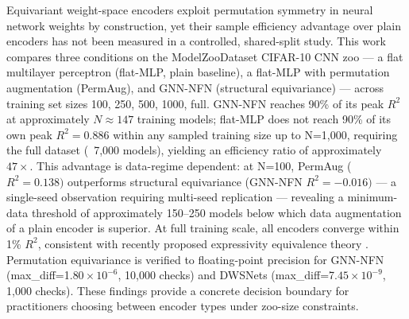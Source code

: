 
Equivariant weight-space encoders exploit permutation symmetry in neural network weights by construction, yet their sample efficiency advantage over plain encoders has not been measured in a controlled, shared-split study. This work compares three conditions on the ModelZooDataset CIFAR-10 CNN zoo --- a flat multilayer perceptron (flat-MLP, plain baseline), a flat-MLP with permutation augmentation (PermAug), and GNN-NFN (structural equivariance) --- across training set sizes {100, 250, 500, 1000, full}. GNN-NFN reaches 90\% of its peak $R^2$ at approximately $N\approx 147$ training models; flat-MLP does not reach 90\% of its own peak $R^{2}=0.886$ within any sampled training size up to N=1,000, requiring the full dataset (~7,000 models), yielding an efficiency ratio of approximately $47\times$. This advantage is data-regime dependent: at N=100, PermAug ($R^{2}=0.138)$ outperforms structural equivariance (GNN-NFN $R^{2}=-0.016)$ --- a single-seed observation requiring multi-seed replication --- revealing a minimum-data threshold of approximately 150--250 models below which data augmentation of a plain encoder is superior. At full training scale, all encoders converge within 1\% $R^2$, consistent with recently proposed expressivity equivalence theory \citep{Dayan2026Expressive}. Permutation equivariance is verified to floating-point precision for GNN-NFN (max\_diff=1.$80\times 10^{-6}$, 10,000 checks) and DWSNets (max\_diff=7.$45\times 10^{-9}$, 1,000 checks). These findings provide a concrete decision boundary for practitioners choosing between encoder types under zoo-size constraints.

